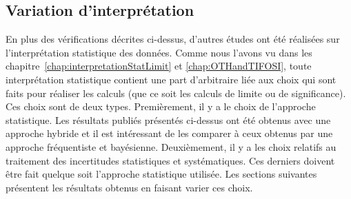 \subsection{Variation d'interpr\'etation}

En plus des v\'erifications d\'ecrites ci-dessus, d'autres \'etudes ont \'et\'e r\'ealis\'ees sur l'interpr\'etation statistique des donn\'ees.
Comme nous l'avons vu dans les chapitre~\ref{chap:interpretationStatLimit} et \ref{chap:OTHandTIFOSI}, toute interpr\'etation statistique contient une part d'arbitraire li\'ee aux choix qui sont faits pour r\'ealiser les calculs (que ce soit les calculs de limite ou de significance). 
Ces choix sont de deux types. Premi\`erement, il y a le choix de l'approche statistique. 
Les r\'esultats publi\'es pr\'esent\'es ci-dessus ont \'et\'e obtenus avec une approche hybride et il est int\'eressant de les comparer \`a ceux obtenus par une approche fr\'equentiste et bay\'esienne. 
Deuxi\`emement, il y a les choix relatifs au traitement des incertitudes statistiques et syst\'ematiques. 
Ces derniers doivent \^etre fait quelque soit l'approche statistique utilis\'ee.
Les sections suivantes pr\'esentent les r\'esultats obtenus en faisant varier ces choix. 

